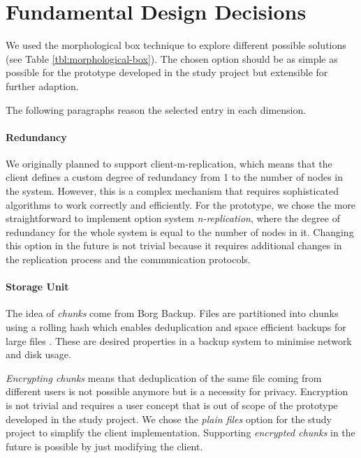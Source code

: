 \section{Fundamental Design Decisions}\label{sec:fundamental-design-decisions}

We used the morphological box technique to explore different possible solutions (see Table \ref{tbl:morphological-box}). The chosen option should be as simple as possible for the prototype developed in the study project but extensible for further adaption.

The following paragraphs reason the selected entry in each dimension.

\paragraph{Redundancy}

We originally planned to support \gls{client-m-replication}, which means that the \gls{client} defines a custom degree of redundancy from 1 to the number of \glspl{node} in the system. However, this is a complex mechanism that requires sophisticated algorithms to work correctly and efficiently. For the prototype, we chose the more straightforward to implement option system \emph{n-replication}, where the degree of redundancy for the whole system is equal to the number of \glspl{node} in it. Changing this option in the future is not trivial because it requires additional changes in the replication process and the communication protocols.

\paragraph{Storage Unit}
The idea of \emph{chunks} come from Borg Backup. Files are partitioned into chunks using a rolling hash which enables deduplication and space efficient backups for large files \cite{borg-data-structures}. These are desired properties in a backup system to minimise network and disk usage.

\emph{Encrypting chunks} means that deduplication of the same file coming from different users is not possible anymore but is a necessity for privacy. Encryption is not trivial and requires a user concept that is out of scope of the prototype developed in the study project.
We chose the \emph{plain files} option for the study project to simplify the \gls{client} implementation. Supporting \emph{encrypted chunks} in the future is possible by just modifying the \gls{client}.

